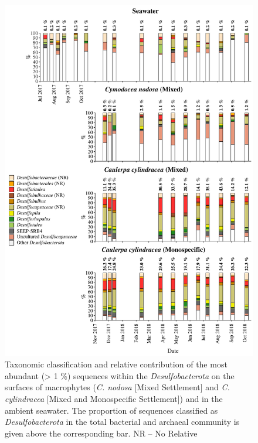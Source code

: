 \documentclass[12pt,]{article}
\begin{document}
\begin{figure}[H]

{\centering \includegraphics[width=0.85\linewidth]{../results/figures/desulfobacterota_bar_plot} 

}

\caption{Taxonomic classification and relative contribution of the most abundant (> 1 \si{\percent}) sequences within the \textit{Desulfobacterota} on the surfaces of macrophytes (\textit{C. nodosa} [Mixed Settlement] and \textit{C. cylindracea} [Mixed and Monospecific Settlement]) and in the ambient seawater. The proportion of sequences classified as \textit{Desulfobacterota} in the total bacterial and archaeal community is given above the corresponding bar. NR -- No Relative\label{desulfo}}\label{fig:unnamed-chunk-9}
\end{figure}
\end{document}
